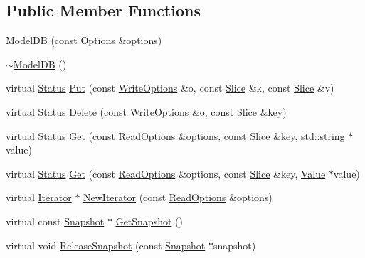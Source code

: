 \subsection*{Public Member Functions}
\begin{DoxyCompactItemize}
\item 
\hyperlink{classleveldb_1_1_model_d_b_ac0117ce964631ff7977b465de053a282}{Model\+D\+B} (const \hyperlink{structleveldb_1_1_options}{Options} \&options)
\item 
\hyperlink{classleveldb_1_1_model_d_b_a35e9042c7ed06e8324d5e40318771825}{$\sim$\+Model\+D\+B} ()
\item 
virtual \hyperlink{classleveldb_1_1_status}{Status} \hyperlink{classleveldb_1_1_model_d_b_a83d0ace11c8ff079f4e6eaa905744253}{Put} (const \hyperlink{structleveldb_1_1_write_options}{Write\+Options} \&o, const \hyperlink{classleveldb_1_1_slice}{Slice} \&k, const \hyperlink{classleveldb_1_1_slice}{Slice} \&v)
\item 
virtual \hyperlink{classleveldb_1_1_status}{Status} \hyperlink{classleveldb_1_1_model_d_b_a2c2690e07a206fd2197f592dd4478ff6}{Delete} (const \hyperlink{structleveldb_1_1_write_options}{Write\+Options} \&o, const \hyperlink{classleveldb_1_1_slice}{Slice} \&key)
\item 
virtual \hyperlink{classleveldb_1_1_status}{Status} \hyperlink{classleveldb_1_1_model_d_b_ab7744a74b5c0d2cd812dd87e83ca561b}{Get} (const \hyperlink{structleveldb_1_1_read_options}{Read\+Options} \&options, const \hyperlink{classleveldb_1_1_slice}{Slice} \&key, std\+::string $\ast$value)
\item 
virtual \hyperlink{classleveldb_1_1_status}{Status} \hyperlink{classleveldb_1_1_model_d_b_a79be5f1a06553112774459f94d893fe4}{Get} (const \hyperlink{structleveldb_1_1_read_options}{Read\+Options} \&options, const \hyperlink{classleveldb_1_1_slice}{Slice} \&key, \hyperlink{classleveldb_1_1_value}{Value} $\ast$value)
\item 
virtual \hyperlink{classleveldb_1_1_iterator}{Iterator} $\ast$ \hyperlink{classleveldb_1_1_model_d_b_a5acf23bae313f2e2f3ea9f0ab95450cf}{New\+Iterator} (const \hyperlink{structleveldb_1_1_read_options}{Read\+Options} \&options)
\item 
virtual const \hyperlink{classleveldb_1_1_snapshot}{Snapshot} $\ast$ \hyperlink{classleveldb_1_1_model_d_b_aa82849af6a149d122e65a4aac412903f}{Get\+Snapshot} ()
\item 
virtual void \hyperlink{classleveldb_1_1_model_d_b_a3f5d86ce612baaa88c11601c9a59df12}{Release\+Snapshot} (const \hyperlink{classleveldb_1_1_snapshot}{Snapshot} $\ast$snapshot)

\end{DoxyCompactItemize}
